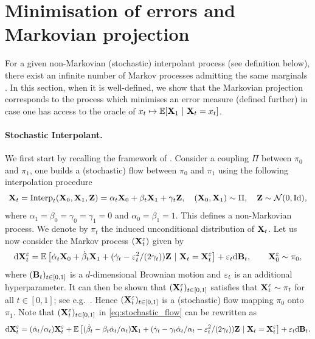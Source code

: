\documentclass{article}
\begin{document}
\section{Minimisation of errors and Markovian projection}
\label{sec:optimality_interpolation}
For a given non-Markovian (stochastic) interpolant process (see definition below), there exist an infinite number of Markov processes admitting the same marginals  \citep{albergo_building_2023}. In this section, when it is well-defined, we show that the Markovian projection corresponds to the process which minimises an error measure (defined further) in case one has access to the oracle of $x_t \mapsto \mathbb{E}[\mathbf{X}_1 \ | \ \mathbf{X}_t = x_t]$.

\paragraph{Stochastic Interpolant.} We first start by recalling the framework of \cite{albergo_building_2023}. Consider a coupling $\Pi$ between $\pi_0$ and $\pi_1$, one builds a (stochastic) flow between $\pi_0$ and $\pi_1$ using the following interpolation procedure
\begin{equation}
\label{eq:interpolant}
    \bfX_t = \mathrm{Interp}_t(\bfX_0, \bfX_1, \bfZ) = \alpha_t \bfX_0 + \beta_t \bfX_1 + \gamma_t \bfZ , \quad (\bfX_0, \bfX_1) \sim \Pi , \quad \bfZ \sim \gN(0, \Id) ,
\end{equation}
where $\alpha_1  = \beta_0 = \gamma_0 = \gamma_1 = 0$ and $\alpha_0 = \beta_1 = 1$. This defines a non-Markovian process. We denote by $\pi_t$ the induced unconditional distribution of $\mathbf{X}_t$.
Let us now consider the Markov process $(\mathbf{X}_t^\varepsilon)$ given by 
\begin{equation}
\label{eq:stochastic_flow}
    \rmd \bfX_t^\vareps = \mathbb{E}\left[\dot{\alpha}_t \bfX_0 + \dot{\beta}_t \bfX_1 + (\dot{\gamma}_t - \vareps_t^2 /(2\gamma_t)) \bfZ \ | \ \bfX_t = \bfX_t^\vareps\right] + \vareps_t \rmd \bfB_t , \qquad \bfX_0^\vareps \sim \pi_0,
\end{equation}
where $(\mathbf{B}_t)_{t \in [0,1]}$ is a $d$-dimensional Brownian motion and $\varepsilon_t$ is an additional hyperparameter. It can then be shown that $(\mathbf{X}_t^\varepsilon)_{t \in [0,1]}$ satisfies that $\mathbf{X}_t^\varepsilon \sim \pi_t$ for all $t\in[0,1]$; see e.g.~\citep[Theorem 2.8, Corollary 2.10]{albergo2023stochastic}. Hence $(\mathbf{X}_t^\varepsilon)_{t \in [0,1]}$ is a (stochastic) flow mapping $\pi_0$ onto $\pi_1$. Note that $(\mathbf{X}_t^\varepsilon)_{t \in [0,1]}$ in \eqref{eq:stochastic_flow} can be rewritten as 
\begin{equation}
\label{eq:stochastic_flow_rewrite}
    \rmd \bfX_t^\vareps = (\dot{\alpha}_t/\alpha_t) \bfX_t^\vareps + \mathbb{E}\left[(\dot{\beta}_t - \beta_t \dot{\alpha}_t / \alpha_t) \bfX_1 + (\dot{\gamma}_t - \gamma_t \dot{\alpha}_t/\alpha_t -  \vareps_t^2 /(2\gamma_t)) \bfZ \ | \ \bfX_t = \bfX_t^\vareps\right] + \vareps_t \rmd \bfB_t.
\end{equation}
\end{document}
